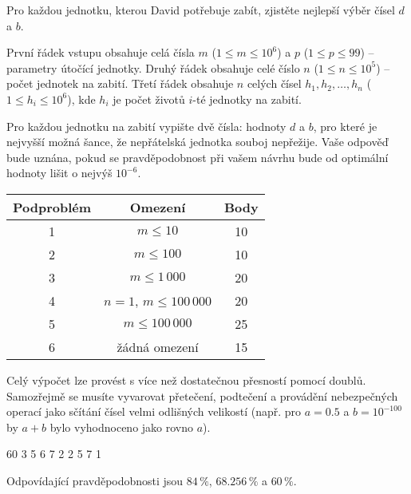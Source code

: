 
Pro každou jednotku, kterou David potřebuje zabít, zjistěte nejlepší výběr čísel $d$ a $b$.


První řádek vstupu obsahuje celá čísla $m$ ($1\leq m\leq 10^6$)
a $p$ ($1\leq p\leq 99$) -- parametry útočící jednotky.
Druhý řádek obsahuje celé číslo $n$ ($1\leq n\leq 10^5$) -- počet jednotek na zabití.
Třetí řádek obsahuje $n$ celých čísel $h_1,h_2,\dots,h_n$ ($1\leq h_i\leq 10^6$),
kde $h_i$ je počet životů $i$-té jednotky na zabití.



Pro každou jednotku na zabití vypište dvě čísla: hodnoty $d$ a $b$, pro které je nejvyšší možná
šance, že nepřátelská jednotka souboj nepřežije. Vaše odpověď bude uznána, pokud se pravděpodobnost
při vašem návrhu bude od optimální hodnoty lišit o nejvýš $10^{-6}$.


\begin{tabular}{|c|c|c|}
	\hline
	Podproblém & Omezení  & Body \\
	\hline
	1 & $m \leq 10$ & 10 \\
	\hline
	2 & $m \leq 100$ & 10 \\
	\hline
	3 & $m \leq 1\,000$ & 20 \\
	\hline
	4 & $n=1$, $m\leq 100\,000$ & 20 \\
	\hline
	5 & $m \leq 100\,000$ & 25 \\
	\hline
	6 & žádná omezení & 15 \\
	\hline
\end{tabular}


Celý výpočet lze provést s více než dostatečnou přesností pomocí doublů.
Samozřejmě se musíte vyvarovat přetečení, podtečení a provádění nebezpečných operací
jako sčítání čísel velmi odlišných velikostí (např. pro $a=0.5$ a $b=10^{-100}$
by $a+b$ bylo vyhodnoceno jako rovno $a$).

 60
3
5 6 7
 2
2 5
7 1

\sampleEND

Odpovídající pravděpodobnosti jsou $84\,\%$, $68.256\,\%$ a $60\,\%$.

